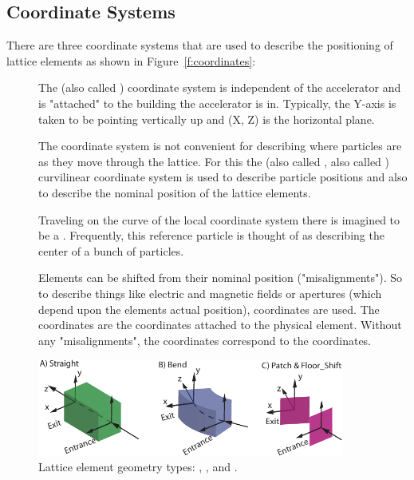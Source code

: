 \documentclass{hitec}
\begin{document}
\subsection{Coordinate Systems}

There are three coordinate systems that are used to describe the positioning
of lattice elements as shown in Figure~\ref{f:coordinates}:
\begin{description}
\item[] \Newline
The  (also called ) coordinate system is independent of the accelerator and is 
"attached" to the building the accelerator is in. Typically, the Y-axis is taken to be pointing vertically up
and (X, Z) is the horizontal plane.
\item[] \Newline
The  coordinate system is not convenient for describing where particles are as they move
through the lattice. For this the  (also called , also called ) curvilinear coordinate 
system is used to describe particle positions and also to describe the nominal position of the
lattice elements.

Traveling on the  curve of the local coordinate system there is imagined to be a .
Frequently, this reference particle is thought of as describing the center of a bunch of particles.
\item[] \Newline
Elements can be shifted from their nominal position ("misalignments"). So to describe things like
electric and magnetic fields or apertures (which depend upon the elements actual position),
 coordinates are used. 
The  coordinates are the coordinates attached to the physical element. Without any "misalignments",
the  coordinates correspond to the  coordinates.
\end{description}

\begin{figure}[tb]
  \centering
  \includegraphics[width=0.9\textwidth]{element-coord-frame.pdf}
  \caption{Lattice element geometry types: , , and .}
  \label{f:body.types}
\end{figure}
\end{document}
